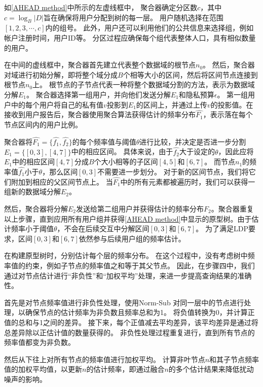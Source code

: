 如\autoref{AHEAD method}中所示的左虚线框中，
聚合器确定分区数$c$，其中$c=\log_B|D|$旨在确保将用户分配到\myahead 树的每一层。
用户随机选择在范围$[1,2,3,\cdots,c]$内的组号。
此外，用户还可以利用他们的公共信息来选择组，例如帐户注册时间，用户ID等。
分区过程应确保每个组代表整体人口，具有相似数量的用户。

在中间的虚线框中，聚合器首先建立代表整个数据域的根节点$n_0$。
然后，聚合器对域进行初始分解，即将整个域分成$B$个相等大小的区间，然后将区间节点连接到根节点$n_0$上。
根节点的子节点代表一种将整个数据域分割的方法，表示为数据域分解$E_1$。
聚合器选择第一组用户，并向他们发送分解$E_1$和隐私预算$\epsilon$。
第一组用户中的每个用户将自己的私有值$v$投影到$E_1$的区间上，并通过\oue 上传$v$的投影值。在接收到用户报告后，聚合器使用聚合算法获得估计的频率分布$\hat{F_1}$，表示落在每个节点区间内的用户比例。

聚合器将$\hat{F_1}=\{\hat{f_1}, \hat{f_2}\}$的每个频率值与阈值$\theta$进行比较，并决定是否进一步分割$E_1=\{[0,3], [4,7]\}$中的相应区间。
具体来说，由于$\hat{f_2}$大于设定的$\theta$，因此应将$E_1$中的相应区间$[4,7]$分成$B$个大小相等的子区间$[4,5]$和$[6,7]$。
而节点$n_1$的频率值$\hat{f_1}$小于$\theta$，那么区间$[0,3]$不需要进一步划分。
对于新的区间节点，我们将它们附加到相应的父区间节点上。
当$\hat{F_1}$中的所有元素都被遍历时，我们可以获得一组新的数据域分解$E_{2}$。

然后，聚合器将分解$E_{2}$发送给第二组用户并获得估计的频率分布$F_2$。聚合器重复以上步骤，直到应用所有用户组并获得\autoref{AHEAD method}中显示的\myahead 原型树。由于估计频率小于阈值$\theta$，\myahead 不会在后续交互中分解区间$[0,3]$和$[6,7]$。
为了满足LDP要求，区间$[0,3]$和$[6,7]$依然参与后续用户组的频率估计。

在构建原型树时，\myahead 分别估计每个层的频率分布。
在这个过程中，\myahead 没有考虑树中频率值的约束，例如子节点的频率值之和等于其父节点。
因此，在步骤四中，我们通过对节点估计进行“非负性”和“加权平均”处理，来进一步提高\myahead 查询结果的准确性。

首先是对节点频率值进行非负性处理，\myahead 使用Norm-Sub \cite{wang2019consistent}对同一层中的节点进行处理，以确保节点的估计频率为非负数且频率总和为1。
\myahead 将负值转换为0，并计算正值的总和与1之间的差异。
接下来，每个正值减去平均差异，该平均差异是通过将总差异除以正估计值的数量获得的。
非负性处理过程重复进行，直到所有节点的频率值都变为非负数。

然后\myahead 从下往上对所有节点的频率值进行加权平均。
\myahead 计算非叶节点$n$和其子节点频率值的加权平均值，以更新$n$的估计频率，即通过融合$n$的多个估计结果来降低扰动噪声的影响。

